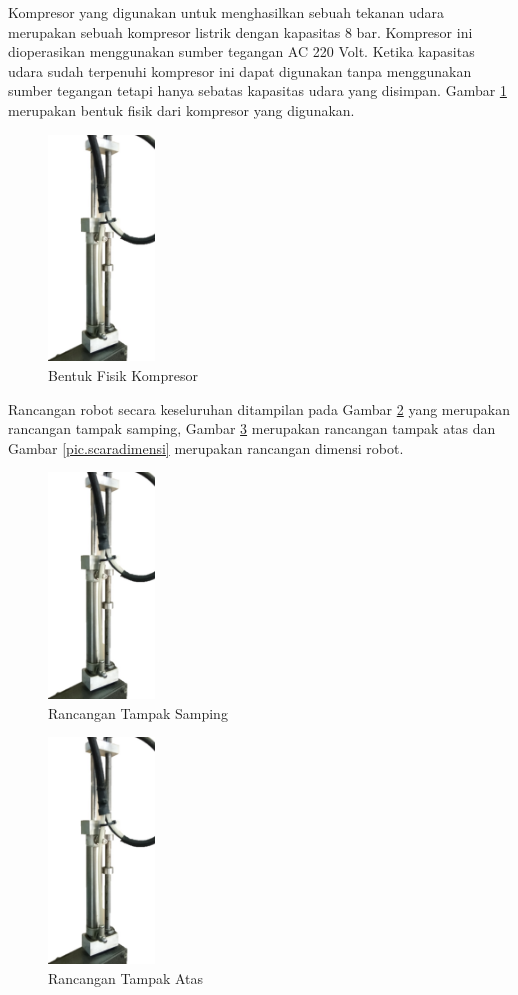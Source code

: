 Kompresor yang digunakan untuk menghasilkan sebuah tekanan udara merupakan sebuah kompresor listrik dengan kapasitas 8 bar. Kompresor ini dioperasikan menggunakan sumber tegangan AC 220 Volt. Ketika kapasitas udara sudah terpenuhi kompresor ini dapat digunakan tanpa menggunakan sumber tegangan tetapi hanya sebatas kapasitas udara yang disimpan. Gambar \ref{pic.kompresor} merupakan bentuk fisik dari kompresor yang digunakan.
\begin{figure}[H]
	\centering
	\includegraphics[height=6cm]{gambar/penuamticsementara.jpg}
	\caption{Bentuk Fisik Kompresor}
	\label{pic.kompresor}
\end{figure}

Rancangan robot secara keseluruhan ditampilan pada Gambar \ref{pic.scarasamping} yang merupakan rancangan tampak samping, Gambar \ref{pic.scaraatas} merupakan rancangan tampak atas dan Gambar \ref{pic.scaradimensi} merupakan rancangan dimensi robot. 
\begin{figure}[H]
	\centering
	\includegraphics[height=6cm]{gambar/penuamticsementara.jpg}
	\caption{Rancangan Tampak Samping}
	\label{pic.scarasamping}
\end{figure}

\begin{figure}[H]
	\centering
	\includegraphics[height=6cm]{gambar/penuamticsementara.jpg}
	\caption{Rancangan Tampak Atas}
	\label{pic.scaraatas}
\end{figure}

